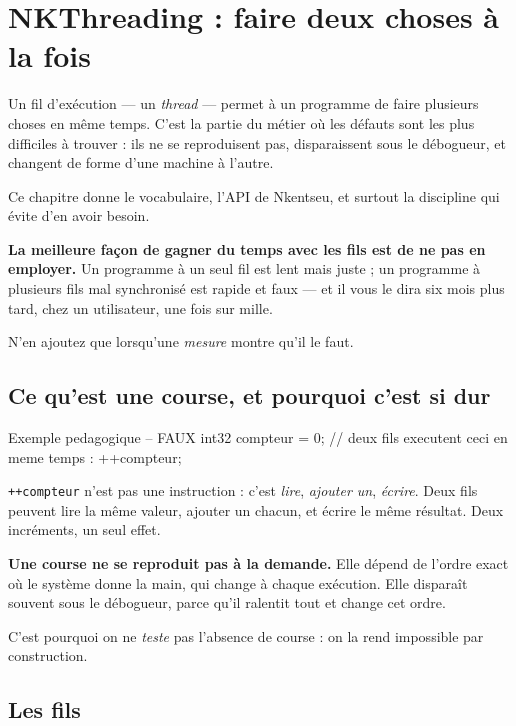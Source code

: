 \chapter{NKThreading : faire deux choses à la fois}

Un fil d'exécution --- un \emph{thread} --- permet à un programme de faire
plusieurs choses en même temps. C'est la partie du métier où les défauts sont les
plus difficiles à trouver : ils ne se reproduisent pas, disparaissent sous le
débogueur, et changent de forme d'une machine à l'autre.

Ce chapitre donne le vocabulaire, l'API de Nkentseu, et surtout la discipline qui
évite d'en avoir besoin.

\begin{nkretenir}
\textbf{La meilleure façon de gagner du temps avec les fils est de ne pas en
employer.} Un programme à un seul fil est lent mais juste ; un programme à
plusieurs fils mal synchronisé est rapide et faux --- et il vous le dira six mois
plus tard, chez un utilisateur, une fois sur mille.

N'en ajoutez que lorsqu'une \emph{mesure} montre qu'il le faut.
\end{nkretenir}

\section{Ce qu'est une course, et pourquoi c'est si dur}

\begin{nkcode}{Exemple pedagogique -- FAUX}
int32 compteur = 0;
// deux fils executent ceci en meme temps :
++compteur;
\end{nkcode}

\texttt{++compteur} n'est pas une instruction : c'est \emph{lire}, \emph{ajouter
un}, \emph{écrire}. Deux fils peuvent lire la même valeur, ajouter un chacun, et
écrire le même résultat. Deux incréments, un seul effet.

\begin{nkpiege}
\textbf{Une course ne se reproduit pas à la demande.} Elle dépend de l'ordre
exact où le système donne la main, qui change à chaque exécution. Elle disparaît
souvent sous le débogueur, parce qu'il ralentit tout et change cet ordre.

C'est pourquoi on ne \emph{teste} pas l'absence de course : on la rend impossible
par construction.
\end{nkpiege}

\section{Les fils}

